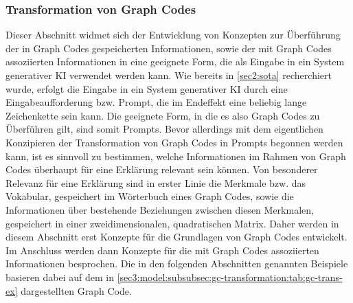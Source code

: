 \subsubsection{Transformation von Graph Codes}
\label{sec3:model:subsubsec:gc-transformation}
Dieser Abschnitt widmet sich der Entwicklung von Konzepten zur Überführung der in Graph Codes gespeicherten Informationen, sowie der mit Graph Codes assoziierten Informationen in eine geeignete Form, die als Eingabe in ein System generativer KI verwendet werden kann.
Wie bereits in \cref{sec2:sota} recherchiert wurde, erfolgt die Eingabe in ein System generativer KI durch eine Eingabeaufforderung bzw. Prompt, die im Endeffekt eine beliebig lange Zeichenkette sein kann.
Die geeignete Form, in die es also Graph Codes zu Überführen gilt, sind somit Prompts.
Bevor allerdings mit dem eigentlichen Konzipieren der Transformation von Graph Codes in Prompts begonnen werden kann, ist es sinnvoll zu bestimmen, welche Informationen im Rahmen von Graph Codes überhaupt für eine Erklärung relevant sein können.
Von besonderer Relevanz für eine Erklärung sind in erster Linie die Merkmale bzw. das Vokabular, gespeichert im Wörterbuch eines Graph Codes, sowie die Informationen über bestehende Beziehungen zwischen diesen Merkmalen, gespeichert in einer zweidimensionalen, quadratischen Matrix.
Daher werden in diesem Abschnitt erst Konzepte für die Grundlagen von Graph Codes entwickelt.
Im Anschluss werden dann Konzepte für die mit Graph Codes assoziierten Informationen besprochen.
Die in den folgenden Abschnitten genannten Beispiele basieren dabei auf dem in \cref{sec3:model:subsubsec:gc-transformation:tab:gc-trans-ex} dargestellten Graph Code.

